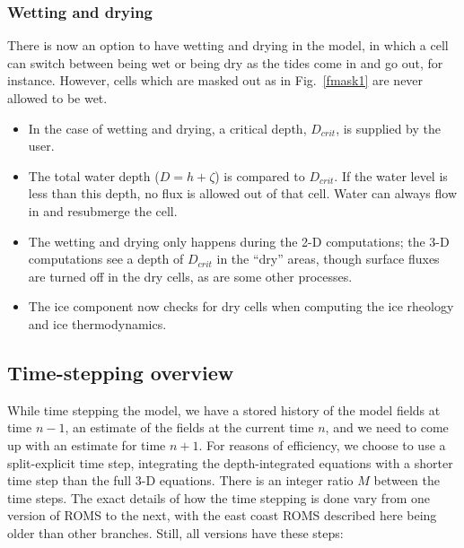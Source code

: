 

\subsubsection{Wetting and drying}

There is now an option to have wetting and drying in the model, in
which a cell can switch between being wet or being dry as the tides
come in and go out, for instance. However, cells which are masked out as in
Fig.~\ref{fmask1} are never allowed to be wet.
\begin{itemize}
   \item In the case of wetting and drying, a critical depth, $D_{crit}$,
is supplied by the user.
   \item The total water depth ($D=h+\zeta$) is compared to $D_{crit}$.
If the water level is less than this depth, no flux is allowed out
of that cell. Water can always flow in and resubmerge the cell.
  \item The wetting and drying only happens during the 2-D
computations; the 3-D computations see a depth of
$D_{crit}$ in the ``dry'' areas, though surface fluxes are turned
off in the dry cells, as are some other processes.
  \item The ice component now checks for dry cells when computing
the ice rheology and ice thermodynamics.
\end{itemize}

\subsection{Time-stepping overview}

While time stepping the model, we have a stored history of the model fields
at time $n-1$, an estimate of the fields at the current time $n$, and
we need to come up with an estimate for time $n+1$. For reasons of
efficiency, we choose to use a split-explicit time step, integrating
the depth-integrated equations with a shorter time step than the full
3-D equations. There is an integer ratio $M$ between the time steps. The
exact details of how the time stepping is done vary from one version
of ROMS to the next, with the east coast ROMS described here being older
than other branches. Still, all versions have these steps:

